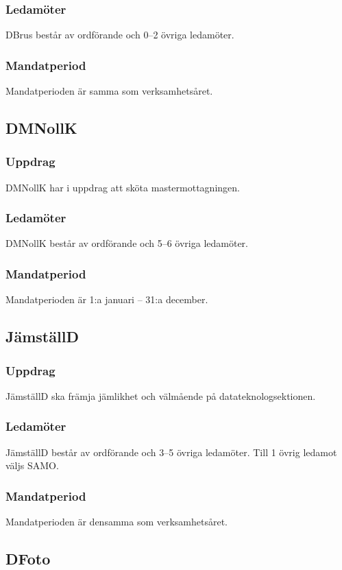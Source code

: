 \subsubsection{Ledamöter}
DBrus består av ordförande och 0--2 övriga ledamöter.
\subsubsection{Mandatperiod}
Mandatperioden är samma som verksamhetsåret.

\subsection{DMNollK}
\subsubsection{Uppdrag}
DMNollK har i uppdrag att sköta mastermottagningen.
\subsubsection{Ledamöter}
DMNollK består av ordförande och 5--6 övriga ledamöter.
\subsubsection{Mandatperiod}
Mandatperioden är 1:a januari -- 31:a december.

\subsection{JämställD}
\subsubsection{Uppdrag}
JämställD ska främja jämlikhet och välmående på datateknologsektionen.
\subsubsection{Ledamöter}
JämställD består av ordförande och 3--5 övriga ledamöter. Till 1 övrig ledamot väljs SAMO.
\subsubsection{Mandatperiod}
Mandatperioden är densamma som verksamhetsåret.

\subsection{DFoto}
